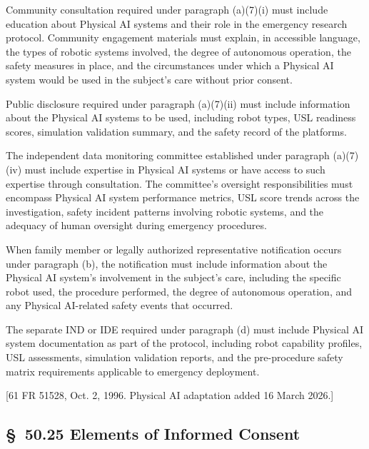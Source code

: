 \documentclass[11pt]{article}
\begin{document}
\begin{description}[leftmargin=1.0cm,style=sameline]
\item[(1)] Community consultation required under paragraph (a)(7)(i) must include education about Physical AI systems and their role in the emergency research protocol. Community engagement materials must explain, in accessible language, the types of robotic systems involved, the degree of autonomous operation, the safety measures in place, and the circumstances under which a Physical AI system would be used in the subject's care without prior consent.

\item[(2)] Public disclosure required under paragraph (a)(7)(ii) must include information about the Physical AI systems to be used, including robot types, USL readiness scores, simulation validation summary, and the safety record of the platforms.

\item[(3)] The independent data monitoring committee established under paragraph (a)(7)(iv) must include expertise in Physical AI systems or have access to such expertise through consultation. The committee's oversight responsibilities must encompass Physical AI system performance metrics, USL score trends across the investigation, safety incident patterns involving robotic systems, and the adequacy of human oversight during emergency procedures.

\item[(4)] When family member or legally authorized representative notification occurs under paragraph (b), the notification must include information about the Physical AI system's involvement in the subject's care, including the specific robot used, the procedure performed, the degree of autonomous operation, and any Physical AI-related safety events that occurred.

\item[(5)] The separate IND or IDE required under paragraph (d) must include Physical AI system documentation as part of the protocol, including robot capability profiles, USL assessments, simulation validation reports, and the pre-procedure safety matrix requirements applicable to emergency deployment.
\end{description}

[61 FR 51528, Oct. 2, 1996. Physical AI adaptation added 16 March 2026.]

\subsection{\S~50.25 Elements of Informed Consent}
\end{document}
